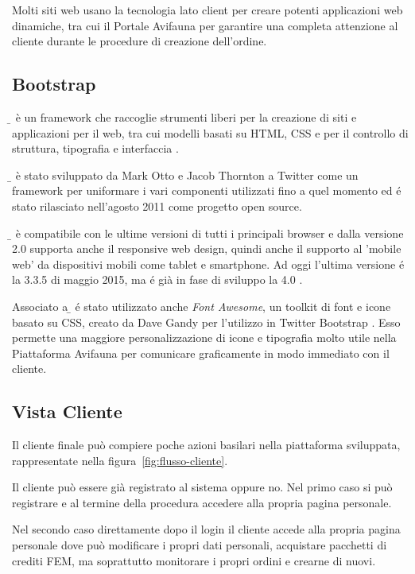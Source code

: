 Molti siti web usano la tecnologia {\js} lato client per creare potenti applicazioni web dinamiche, tra cui il Portale Avifauna per garantire una completa attenzione al cliente durante le procedure di creazione dell'ordine.

\subsection{Bootstrap}
\label{subs:bootstrap}
\emph{{\b}} è un framework che raccoglie strumenti liberi per la creazione di siti e applicazioni per il web, tra cui modelli basati su HTML, CSS e {\js} per il controllo di struttura, tipografia e interfaccia \cite{bootstrap}.

{\b} è stato sviluppato da Mark Otto e Jacob Thornton a Twitter come un framework per uniformare i vari componenti utilizzati fino a quel momento ed é stato rilasciato nell'agosto 2011 come progetto open source.

{\b} è compatibile con le ultime versioni di tutti i principali browser e dalla versione 2.0 supporta anche il responsive web design, quindi anche il supporto al 'mobile web' da dispositivi mobili come tablet e smartphone. Ad oggi l'ultima versione é la 3.3.5 di maggio 2015, ma é già in fase di sviluppo la 4.0 \cite{bootstrap-github}.

Associato a {\b} é stato utilizzato anche \emph{Font Awesome}, un toolkit di font e icone basato su CSS, creato da Dave Gandy per l'utilizzo in Twitter Bootstrap \cite{fontawesome} \cite{fontawesome-github}. Esso permette una maggiore personalizzazione di icone e tipografia molto utile nella Piattaforma Avifauna per comunicare graficamente in modo immediato con il cliente.

\newpage
\subsection{Vista Cliente}
\label{subs:cliente}
Il cliente finale può compiere poche azioni basilari nella piattaforma sviluppata, rappresentate nella figura~\ref{fig:flusso-cliente}.

Il cliente può essere già registrato al sistema oppure no. Nel primo caso si può registrare e al termine della procedura accedere alla propria pagina personale.

Nel secondo caso direttamente dopo il login il cliente accede alla propria pagina personale dove può modificare i propri dati personali, acquistare pacchetti di crediti FEM, ma soprattutto monitorare i propri ordini e crearne di nuovi. 

